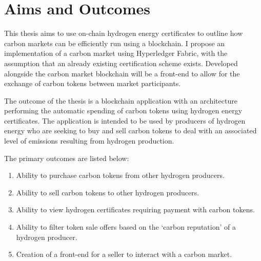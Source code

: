 \section{Aims and Outcomes}

This thesis aims to use on-chain hydrogen energy certificates to
outline how carbon markets can be efficiently run using a blockchain.
I propose an implementation of a carbon market using Hyperledger
Fabric, with the assumption that an already existing
certification scheme exists. Developed alongside the carbon
market blockchain will be a front-end to allow for the
exchange of carbon tokens between market participants.

The outcome of the thesis is a blockchain application with an architecture
performing the automatic spending of carbon tokens using hydrogen
energy certificates. The application is intended to be used by
producers of hydrogen energy who are seeking to buy and sell carbon
tokens to deal with an associated level of emissions resulting from
hydrogen production.

The primary outcomes are listed below:
\begin{enumerate}
    \item Ability to purchase carbon tokens from other hydrogen producers.
    \item Ability to sell carbon tokens to other hydrogen producers.
    \item Ability to view hydrogen certificates requiring payment with
          carbon tokens.
    \item Ability to filter token sale offers based on the `carbon reputation'
          of a hydrogen producer.
    \item Creation of a front-end for a seller to interact with a carbon
          market.
\end{enumerate}